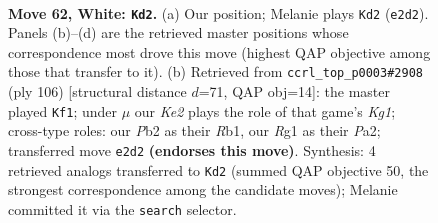 \documentclass[11pt]{article}
\begin{document}
\clearpage

\begin{figure}[p]\centering
\begin{subfigure}{0.46\textwidth}\centering
\resizebox{\linewidth}{!}{%
\newchessgame
\chessboard[
  setfen={4rb2/4k1p1/p1p4r/Pp1b1p1p/2p2P1P/2B1P1P1/1P2K2N/1R4R1 w - - 25 62},
  showmover=false,
  pgfstyle=straightmove, color=movearrow, markmove={e2-d2}
]}
\caption{}
\end{subfigure}\hfill
\begin{subfigure}{0.46\textwidth}\centering
\resizebox{\linewidth}{!}{%
\newchessgame
\chessboard[
  setfen={r7/5p2/1p1rk3/1B1p3p/P1pPp2P/4PbP1/PR3P2/1R4K1 w - - 19 54},
  showmover=false,
  pgfstyle=straightmove, color=movearrow, markmove={g1-f1}
]}
\caption{}
\end{subfigure}
\\[4pt]

\caption{\textbf{Move 62, White: \texttt{Kd2}.} (a) Our position; Melanie plays \texttt{Kd2} (\texttt{e2d2}). Panels (b)--(d) are the retrieved master positions whose correspondence most drove this move (highest QAP objective among those that transfer to it). (b) Retrieved from \texttt{ccrl\_top\_p0003\#2908} (ply 106) [structural distance $d$=71, QAP obj=14]: the master played \texttt{Kf1}; under $\mu$ our \emph{Ke2} plays the role of that game's \emph{Kg1}; cross-type roles: our \emph{P}b2 as their \emph{R}b1, our \emph{R}g1 as their \emph{P}a2; transferred move \texttt{e2d2} \textbf{(endorses this move)}. Synthesis: 4 retrieved analogs transferred to \texttt{Kd2} (summed QAP objective 50, the strongest correspondence among the candidate moves); Melanie committed it via the \texttt{search} selector.}
\label{fig:thought-m122}
\end{figure}

\clearpage
\end{document}
